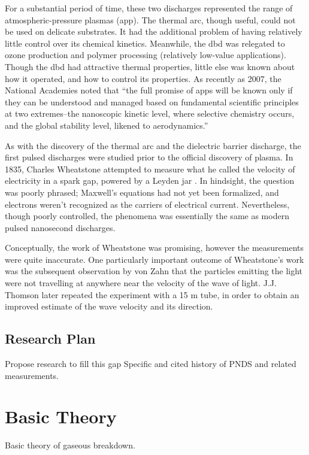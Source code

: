 For a substantial period of time, these two  discharges
represented the range of atmospheric-pressure plasmas (\acs{app}). The thermal
arc, though useful, could not be used on delicate substrates. It had the
additional problem of having relatively little control over its chemical
kinetics. Meanwhile, the \acs{dbd} was relegated to ozone production and polymer
processing (relatively low-value applications). Though the \acs{dbd} had
attractive thermal properties, little else was known about how it operated, and
how to control its properties. As recently as 2007, the National Academies
noted that ``the full promise of \acs{app}s will be known only if they can be
understood and managed based on fundamental scientific principles at two
extremes--the nanoscopic kinetic level, where selective chemistry occurs, and
the global stability level, likened to aerodynamics.''

As with the discovery of the thermal arc and the dielectric barrier discharge,
the first pulsed discharges were studied prior to the official discovery of
plasma. In 1835, Charles Wheatstone attempted to measure what he called the
velocity of electricity in a spark gap, powered by a Leyden jar
\cite{Wheatstone1835}. In hindsight, the question was poorly phrased; Maxwell's
equations had not yet been formalized, and electrons weren't recognized as the
carriers of electrical current. Nevertheless, though poorly controlled, the
phenomena was essentially the same as modern pulsed nanosecond discharges.

Conceptually, the work of Wheatstone was promising, however the measurements
were quite inaccurate. One particularly important outcome of Wheatstone's work
was the subsequent observation by von Zahn that the particles emitting the light
were not travelling at anywhere near the velocity of the wave of light. J.J.
Thomson later repeated the experiment with a 15 m tube, in order to obtain an
improved estimate of the wave velocity and its direction. 

\subsection{Research Plan}

Propose research to fill this gap
Specific and cited history of PNDS and related measurements.

\section{Basic Theory}

Basic theory of gaseous breakdown.
